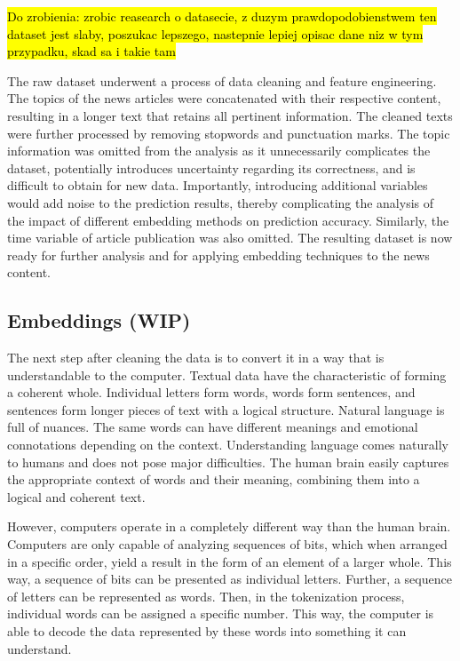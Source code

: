 \hl{Do zrobienia: zrobic reasearch o datasecie, z duzym prawdopodobienstwem ten dataset jest slaby, poszukac lepszego, nastepnie lepiej opisac dane niz w tym przypadku, skad sa i takie tam}

The raw dataset underwent a process of data cleaning and feature engineering. The topics of the news articles were concatenated with their respective content, resulting in a longer text that retains all pertinent information. The cleaned texts were further processed by removing stopwords and punctuation marks. The topic information was omitted from the analysis as it unnecessarily complicates the dataset, potentially introduces uncertainty regarding its correctness, and is difficult to obtain for new data. Importantly, introducing additional variables would add noise to the prediction results, thereby complicating the analysis of the impact of different embedding methods on prediction accuracy. Similarly, the time variable of article publication was also omitted. The resulting dataset is now ready for further analysis and for applying embedding techniques to the news content.


\subsection{Embeddings (WIP)}
The next step after cleaning the data is to convert it in a way that is understandable to the computer. Textual data have the characteristic of forming a coherent whole. Individual letters form words, words form sentences, and sentences form longer pieces of text with a logical structure. Natural language is full of nuances. The same words can have different meanings and emotional connotations depending on the context. Understanding language comes naturally to humans and does not pose major difficulties. The human brain easily captures the appropriate context of words and their meaning, combining them into a logical and coherent text.

However, computers operate in a completely different way than the human brain. Computers are only capable of analyzing sequences of bits, which when arranged in a specific order, yield a result in the form of an element of a larger whole. This way, a sequence of bits can be presented as individual letters. Further, a sequence of letters can be represented as words. Then, in the tokenization process, individual words can be assigned a specific number. This way, the computer is able to decode the data represented by these words into something it can understand.

